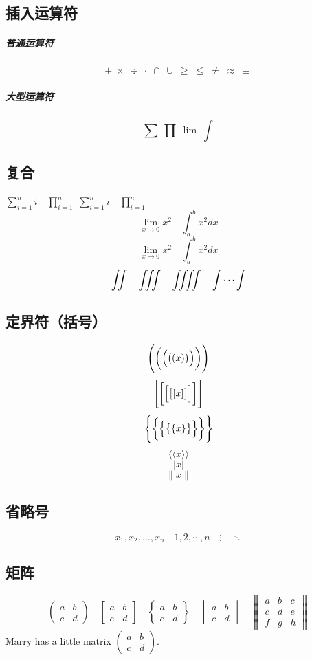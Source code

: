 \documentclass[UTF8]{ctexart}
\begin{document}
\subsection{插入运算符}
\subparagraph{普通运算符}
\[\pm \; \times \; \div \; \cdot \; \cap \; \cup \;
\geq \; \leq \; \neq \; \approx \; \equiv \]
\subparagraph{大型运算符}
\[\sum \; \prod \; \lim \; \int \]

\subsection{复合}
$ \sum_{i=1}^n i\quad \prod_{i=1}^n $
$ \sum\limits _{i=1}^n i\quad \prod\limits _{i=1}^n $
\[ \lim_{x\to0}x^2 \quad \int_a^b x^2 dx \]
\[ \lim _{x\to0}x^2 \quad \int\nolimits_a^b x^2 dx \]
\[ \iint\quad \iiint\quad \iiiint\quad \idotsint \]

\subsection{定界符（括号）}
\[ \Biggl( \biggl( \Bigl( \bigl( (x) \bigr) \Bigr) \biggr) \Biggr) \]
\[ \Biggl[ \biggl[ \Bigl[ \bigl[ [x] \bigr] \Bigr] \biggr] \Biggr] \]
\[ \Biggl\{ \biggl\{ \Bigl\{ \bigl\{ \{x\} \bigr\} \Bigr\} \biggr\} \Biggr\} \]
\[ \Biggl\langle \langle x \rangle \Biggr \rangle \]
\[ \Biggl\lvert x \Biggr\rvert \]
\[ \Biggl\lVert x \Biggr\rVert \]

\subsection{省略号}
\[ x_1, x_2, \dots , x_n\quad 1, 2, \cdots ,n\quad \vdots\quad \ddots \]

\subsection{矩阵}
\[ \begin{pmatrix} a&b\\c&d \end{pmatrix} \quad
\begin{bmatrix} a&b\\c&d \end{bmatrix} \quad
\begin{Bmatrix} a&b\\c&d \end{Bmatrix} \quad
\begin{vmatrix} a&b\\c&d \end{vmatrix} \quad
\begin{Vmatrix} a&b&c\\c&d&e\\f&g&h \end{Vmatrix} \]
Marry has a little matrix $ (\begin{smallmatrix} a&b\\c&d \end{smallmatrix} ) $.
\end{document}
